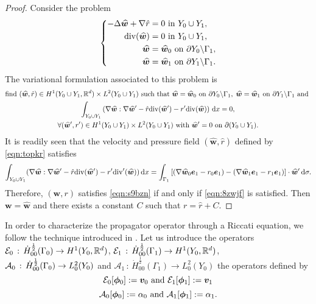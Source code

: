 \documentclass[a4paper,10pt,reqno]{amsart}
\begin{document}
\begin{proof}
    Consider the problem    
    \renewcommand{\w}{\widehat{\bm w}}
    \[
    \left\{\begin{aligned}
            -\Delta \w +\nabla \hat r &= 0 \In Y_0\cup Y_1,\\    
            \div(\w)& = 0 \In Y_0\cup Y_1,\\    
            \w &=  \w_0 \On \partial Y_0\backslash \Gamma_1,\\  
            \w &=  \w_1 \On \partial Y_1 \backslash\Gamma_1.
    \end{aligned}
    \right.
    \] 
    The variational formulation associated to this problem is   
    \begin{multline}
    \text{find }(\w,\hat r)\in H^{1}(Y_0\cup Y_1,\R^{d})\times L^{2}(Y_0\cup Y_1) \text{
    such that }\w=\w_0 \On \partial Y_0\backslash\Gamma_1,\; \w=\w_1 \On \partial
    Y_1\backslash\Gamma_1 \text{ and }\\    
    \int_{Y_0\cup Y_1}\left(\nabla\w:\nabla \w'-\hat r \div(\w') -
    r'\div(\w)\right) \D x =0, \\  \forall (\w',r')\in H^{1}(Y_0\cup Y_1)\times
    L^{2}(Y_0\cup Y_1) \text{ with }\w'=0\On \partial (Y_0\cup Y_1).
    \end{multline} 
    It is readily seen that the velocity and pressure field $(\w,\hat r)$ defined by
    \cref{eqn:topkr} satisfies  
    \[
    \int_{Y_0\cup Y_1}(\nabla\w:\nabla \w'-\hat r\div(\w')-r'\div'(\w))\D x =
    \int_{\Gamma_1}\left[ (\nabla\w_0\e_1-r_0\e_1)-(\nabla \w_1\e_1-r_1\e_1)
    \right]\cdot \w'\D \sigma.
    \] 
    \renewcommand{\w}{{\bm w}}     
    Therefore, $(\w,r)$ satisfies \cref{eqn:s9bzn} if and only if \cref{eqn:8zwjf} is
    satisfied. Then $\w=\hat \w$ and there exists a constant $C$ such that $r=\hat
    r+C$. 
\end{proof}
In order to characterize the propagator operator through a Riccati equation, we
follow the technique introduced in \cite{fliss_dirichlet--neumann_2013}. Let us
introduce the operators $\mathcal{E}_0\,:\, \dot{H}^{\frac{1}{2}}_{00}(\Gamma_0)\to H^{1}(Y_0,\mathbb{R}^{d})$, 
$\mathcal{E}_1\,:\,\dot H^{\frac{1}{2}}_{00}(\Gamma_1)\to H^{1}(Y_0,\mathbb{R}^{d})$,   
$\mathcal{A}_0\,:\, \dot{H}^{\frac{1}{2}}_{00}(\Gamma_0)\to L^{2}_0(Y_0)$ and   
$\mathcal{A}_1\,:\, \dot H^{\frac{1}{2}}_{00}(\Gamma_1)\to L^{2}_0(Y_0)$ the
operators defined by    
\begin{equation}
    \label{eqn:2a0sn}\mathcal{E}_0[{\bm \phi}_0]:={\bm v}_0 \text{ and
    }\mathcal{E}_1[{\bm \phi}_1]:={\bm v}_1 
\end{equation}
\begin{equation}
\label{eqn:qywvj}   
\mathcal{A}_0[{\bm \phi}_0]:=\alpha_0 \text{ and }\mathcal{A}_1[{\bm \phi}_1]:=\alpha_1.
\end{equation}
\end{document}
